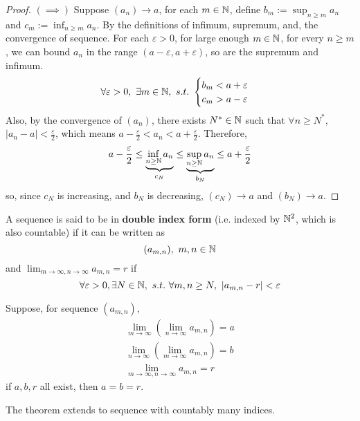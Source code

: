 \documentclass[11pt]{article}
\begin{document}
		\begin{proof}
			$(\implies)$ Suppose $(a_n) \to a$, for each $m \in \mathbb{N}$, define
			$b_m := \sup_{n \geq m}a_n$ and $c_m := \inf_{n \geq m}a_n$. By the definitions of infimum, supremum, and, the convergence of sequence. For each $\varepsilon > 0$, for large enough $m \in \mathbb{N}$, for every $n \geq m$, we can bound $a_n$ in the range $(a - \varepsilon, a + \varepsilon)$, so are the supremum and infimum.
			\begin{equation}
				\forall \varepsilon > 0,\ \exists m \in \N,\ s.t.\ 
				\begin{cases}
					b_m < a + \varepsilon \\
					c_m > a - \varepsilon
				\end{cases}
			\end{equation}
			Also, by the convergence of $(a_n)$, there exists $N^* \in \mathbb{N}$ such that $\forall n \geq N^*$, $|a_n - a| < \frac{\varepsilon}{2}$, which means $a - \frac{\varepsilon}{2} < a_n < a + \frac{\varepsilon}{2}$. Therefore,
			\begin{equation}
				a - \frac{\varepsilon}{2} 
				\leq \underbrace{\inf_{n \geq \mathbb{N}} a_n}_{c_N}
				\leq \underbrace{\sup_{n \geq \mathbb{N}} a_n}_{b_N}
				\leq a + \frac{\varepsilon}{2}
			\end{equation}
			so, since $c_N$ is increasing, and $b_N$ is decreasing, $(c_N) \to a$ and $(b_N) \to a$.
		\end{proof}
		
		\begin{definition}
			A sequence is said to be in \textbf{double index form} (i.e. indexed by $\mathbb{N}^2$, which is also countable) if it can be written as
			\begin{equation}
				(a_{m, n}),\ m, n \in \mathbb{N}
			\end{equation}
			and $\lim_{m \to \infty, n \to \infty}a_{m, n} = r$ if
			\begin{equation}
				\forall \varepsilon > 0, \exists N \in \mathbb{N},\ s.t.\ \forall m, n \geq N,\ |a_{m,n} - r| < \varepsilon
			\end{equation}
		\end{definition}
		
		\begin{theorem}
			Suppose, for sequence $(a_{m, n})$,
			\begin{gather}
				\lim_{m \to \infty} (\lim_{n \to \infty} a_{m, n}) = a \\
				\lim_{n \to \infty} (\lim_{m \to \infty} a_{m, n}) = b \\
				\lim_{m \to \infty, n \to \infty}a_{m, n} = r
			\end{gather}
			if $a, b, r$ all exist, then $a=b=r$.
		\end{theorem}
		
		\begin{remark}
			The theorem extends to sequence with countably many indices.
		\end{remark}
\end{document}
